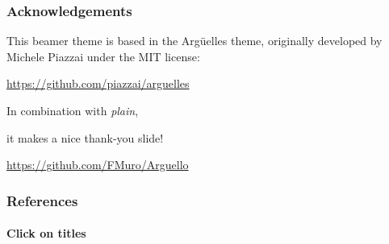 \documentclass{beamer}
\begin{document}
\begin{frame}
      \frametitle{Acknowledgements}

      This beamer theme is based in the Argüelles theme, originally developed by Michele Piazzai under the MIT license:

      \bigskip

      \url{https://github.com/piazzai/arguelles}

\end{frame}

\ThankYou
\begin{frame}
      In combination with \textit{plain},\par
      it makes a nice thank-you slide!
      \vfill\scalebox{4}{\faGithub}\par\bigskip
      \url{https://github.com/FMuro/Arguello}
\end{frame}

\begin{frame}[allowframebreaks]
      \frametitle{References}
      \framesubtitle{Click on titles}
      \nocite{*}
      \printbibliography[heading=none]
\end{frame}
\end{document}
